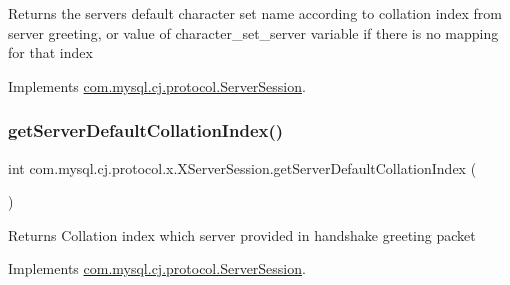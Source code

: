 \begin{DoxyReturn}{Returns}
the server\textquotesingle{}s default character set name according to collation index from server greeting, or value of \textquotesingle{}character\+\_\+set\+\_\+server\textquotesingle{} variable if there is no mapping for that index 
\end{DoxyReturn}


Implements \mbox{\hyperlink{interfacecom_1_1mysql_1_1cj_1_1protocol_1_1_server_session_afeb928036af67a7fff2d45783673c72d}{com.\+mysql.\+cj.\+protocol.\+Server\+Session}}.

\mbox{\label{classcom_1_1mysql_1_1cj_1_1protocol_1_1x_1_1_x_server_session_abbcbd0f1d4c0c4fab564b3ce8083ecf7}} 
\subsubsection{\texorpdfstring{get\+Server\+Default\+Collation\+Index()}{getServerDefaultCollationIndex()}}
{\footnotesize\ttfamily int com.\+mysql.\+cj.\+protocol.\+x.\+X\+Server\+Session.\+get\+Server\+Default\+Collation\+Index (\begin{DoxyParamCaption}{ }\end{DoxyParamCaption})}

\begin{DoxyReturn}{Returns}
Collation index which server provided in handshake greeting packet 
\end{DoxyReturn}


Implements \mbox{\hyperlink{interfacecom_1_1mysql_1_1cj_1_1protocol_1_1_server_session_a840bf74b75252459afd6b33ae21c8379}{com.\+mysql.\+cj.\+protocol.\+Server\+Session}}.

\mbox{\label{classcom_1_1mysql_1_1cj_1_1protocol_1_1x_1_1_x_server_session_a1cfb3ee1396e5a92fea06afdf6a24944}} 

